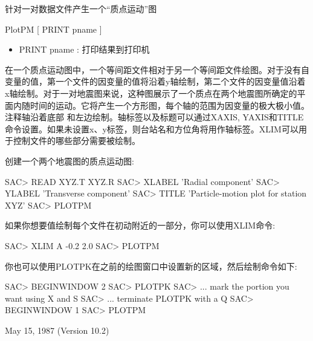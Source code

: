 \label{cmd:plotpm}

针对一对数据文件产生一个``质点运动''图

PlotPM [ PRINT pname ]

\begin{itemize}
\item PRINT pname : 打印结果到打印机
\end{itemize}

在一个质点运动图中，一个等间距文件相对于另一个等间距文件绘图。对于没有自变量的值，第一个文件的因变量的值将沿着y轴绘制，第二个文件的因变量值沿着x轴绘制。对于一对地震图来说，这种图展示了一个质点在两个地震图所确定的平面内随时间的运动。它将产生一个方形图，每个轴的范围为因变量的极大极小值。注释轴沿着底部	和左边绘制。轴标签以及标题可以通过XAXIS, YAXIS和TITLE命令设置。如果未设置x、y标签，则台站名和方位角将用作轴标签。XLIM可以用于控制文件的哪些部分需要被绘制。

创建一个两个地震图的质点运动图:
\begin{SACCode}
SAC> READ XYZ.T XYZ.R
SAC> XLABEL 'Radial component'
SAC> YLABEL 'Transverse component'
SAC> TITLE 'Particle-motion plot for station XYZ'
SAC> PLOTPM
\end{SACCode}

如果你想要值绘制每个文件在初动附近的一部分，你可以使用XLIM命令:
\begin{SACCode}
SAC>  XLIM A -0.2 2.0
SAC>  PLOTPM
\end{SACCode}
你也可以使用PLOTPK在之前的绘图窗口中设置新的区域，然后绘制命令如下:

\begin{SACCode}
SAC> BEGINWINDOW 2
SAC> PLOTPK
SAC> ... mark the portion you want using X and S
SAC> ... terminate PLOTPK with a Q
SAC> BEGINWINDOW 1
SAC> PLOTPM
\end{SACCode}

May 15, 1987 (Version 10.2)
